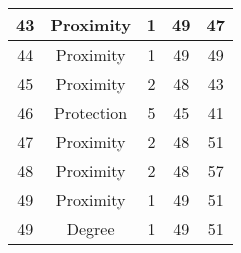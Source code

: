 \documentclass[results.tex]{subfiles}
\begin{document}
\begin{center}
\begin{tabular}{| c || c | c | c | c |}
            \hline
            43                      & Proximity                    & 1                      & 49                      & 47                   \\
            \hline
            44                      & Proximity                    & 1                      & 49                      & 49                   \\
            \hline
            45                      & Proximity                    & 2                      & 48                      & 43                   \\
            \hline
            46                      & Protection                   & 5                      & 45                      & 41                   \\
            \hline
            47                      & Proximity                    & 2                      & 48                      & 51                   \\
            \hline
            48                      & Proximity                    & 2                      & 48                      & 57                   \\
            \hline
            49                      & Proximity                    & 1                      & 49                      & 51                   \\
            \hline
            49                      & Degree                       & 1                      & 49                      & 51                   \\
            \hline
        \end{tabular}
    \end{center}
\end{document}
